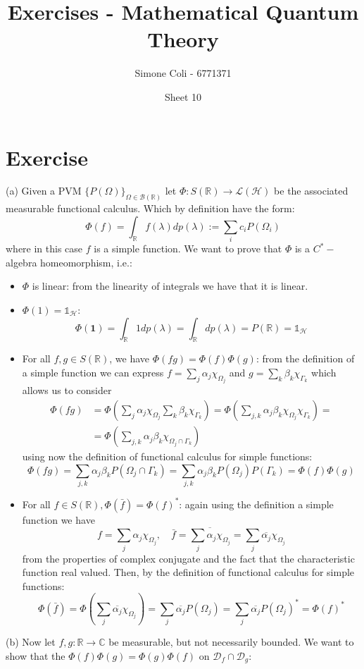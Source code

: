 \documentclass{article}
\title{Exercises - Mathematical Quantum Theory}
\author{Simone Coli - 6771371}
\date{Sheet 10}
\newcommand{\R}{\mathbb{R}}
\newcommand{\C}{\mathbb{C}}
\begin{document}
\maketitle

\section{Exercise}
(a) Given a PVM ${\{ P(\Omega) \}}_{\Omega \in \mathcal{B} (\R)}$ let $\Phi: S(\R) \to \mathcal{L} (\mathcal{H})$ be the associated measurable functional calculus. Which by definition have the form:
    \[
        \Phi(f) = \int_\R f(\lambda) dp(\lambda) := \sum_i c_i P(\Omega_i)
    \]
where in this case $f$ is a simple function. We want to prove that $\Phi$ is a $C^*-$algebra homeomorphism, i.e.:
\begin{itemize}
    \item $\Phi$ is linear: from the linearity of integrals we have that it is linear.
    \item $\Phi(1) = \mathds{1}_\mathcal{H}$:
    \[
        \Phi(\mathbf 1) = \int_\R 1 dp (\lambda) = \int_\R dp (\lambda) = P(\R) = \mathds{1}_\mathcal{H}
    \]
    \item For all $f, g \in S(\R)$, we have $\Phi(fg) = \Phi(f)\Phi(g)$: from the definition of a simple function we can express $f = \sum_j \alpha_j \chi_{\Omega_j}$ and $g = \sum_k \beta_k \chi_{\Gamma_k}$ which allows us to consider
    \[
        \begin{split}
            \Phi(fg) &= \Phi \left(\sum_j \alpha_j \chi_{\Omega_j} \sum_k \beta_k \chi_{\Gamma_k}\right) = \Phi \left(\sum_{j,k} \alpha_j \beta_k \chi_{\Omega_j} \chi_{\Gamma_k}\right) =\\
            & = \Phi \left(\sum_{j,k} \alpha_j \beta_k \chi_{\Omega_j \cap \Gamma_k}\right)
        \end{split}
    \]
    using now the definition of functional calculus for simple functions:
    \[
        \Phi(fg) = \sum_{j,k} \alpha_j \beta_k P(\Omega_j \cap \Gamma_k) = \sum_{j,k} \alpha_j \beta_k P(\Omega_j) P (\Gamma_k) = \Phi(f)\Phi(g)
    \]
    \item For all $f \in S(\R), \Phi(\bar f) = \Phi(f)^*$: again using the definition a simple function we have
    \[
        f = \sum_j \alpha_j \chi_{\Omega_j}, \quad \bar f = \overline{\sum_j \alpha_j \chi_{\Omega_j}} = \sum_j \overline{\alpha_j} \chi_{\Omega_j}
    \]
    from the properties of complex conjugate and the fact that the characteristic function real valued. Then, by the definition of functional calculus for simple functions:
    \[
        \Phi(\bar f) = \Phi \left( \sum_j \overline{\alpha_j} \chi_{\Omega_j} \right) = \sum_j \overline{\alpha_j} P(\Omega_j)  = \sum_j \overline{\alpha_j} P(\Omega_j)^* = \Phi(f)^*
    \]
\end{itemize} 
(b) Now let $f, g  : \R \to \C$ be measurable, but not necessarily bounded. We want to show that the $\Phi(f) \Phi(g) = \Phi (g)\Phi(f)$ on $\mathcal{D}_f \cap \mathcal{D}_g$:
\end{document}
